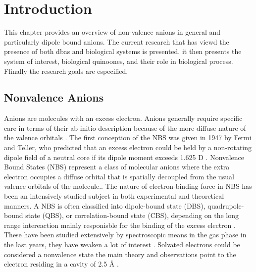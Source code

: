 \chapter{Introduction}\label{ch:introduction}

This chapter provides an overview of non-valence anions in general and particularly dipole bound anions. The current research that has viewd the presence of both dbas and biological systems is presented. it then presents the system of interest, biological quinoones, and their role in biological process. Ffinally the research goals are especified.

\section{Nonvalence Anions}
Anions are molecules with an excess electron. Anions generally require specific care in terms of their ab initio description because of the more diffuse nature of the valence
orbitals \cite{simons2008molecular,simons2023molecular}. The first conception of the NBS was given in 1947 by Fermi and Teller, who predicted that an excess electron could be held by a non-rotating dipole field of a neutral core if its dipole moment exceeds 1.625 D \cite{fermi1947capture}.
Nonvalence Bound States (NBS)  represent a class of molecular anions where the extra electron occupies a diffuse orbital that is spatially decoupled from the usual valence orbitals of the molecule.\cite{jordan2003theory}. The nature of electron-binding
force in NBS has been an intensively studied subject in both experimental and theoretical manners. A NBS is often classified into dipole-bound state (DBS), quadrupole-bound state (QBS), or correlation-bound state (CBS), depending on the long range intereaction mainly responisble for the binding of the excess electron \cite{abdoul1998electrons}.
These have been studied extensively by spectroscopic means in the gas phase in the last years, they have weaken a lot of interest \cite{kang2024reaction}.
Solvated electrons could be considered a nonvalence state the main theory and observations point to the electron residing in a cavity of 2.5 \r{A} \cite{herbert2017hydrated}.

